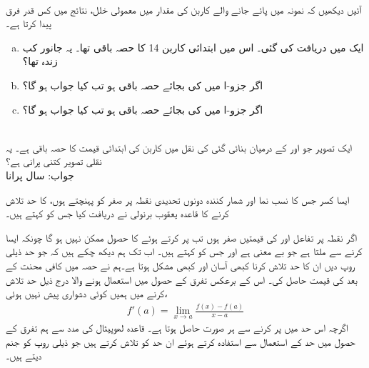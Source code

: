 \\
آئیں دیکھیں کہ نمونہ میں پائے جانے والے کاربن کی مقدار میں معمولی خلل، نتائج میں کس قدر فرق پیدا کرتا ہے۔
\begin{enumerate}[a.]
\item
ایک   میں دریافت کی گئی۔ اس میں ابتدائی کاربن 14 کا  حصہ باقی تھا۔ یہ جانور کب زندہ تھا؟
\item
اگر جزو-ا میں  کی بجائے  حصہ باقی ہو تب کیا جواب ہو گا؟
\item
اگر جزو-ا میں  کی بجائے  حصہ باقی ہو تب کیا جواب ہو گا؟
\end{enumerate}
\\
ایک تصویر جو  اور  کے درمیان بنائی گئی کی نقل میں کاربن  کی ابتدائی قیمت کا  حصہ باقی ہے۔ یہ نقلی تصویر کتنی پرانی ہے؟\\
جواب:\quad
{} سال پرانا

ایسا کسر جس کا نسب نما اور شمار کنندہ دونوں تحدیدی نقطہ پر  صفر کو پہنچتے ہوں، کا حد تلاش کرنے کا قاعدہ یعقوب برنولی نے دریافت کیا جس کو  کہتے ہیں۔

اگر نقطہ  پر تفاعل  اور  کی قیمتیں صفر ہوں تب  پر کرتے ہوئے   کا حصول ممکن نہیں ہو گا چونکہ ایسا کرنے سے  ملتا ہے جو بے معنی ہے اور  جس کو  کہتے ہیں۔ اب تک ہم دیکھ چکے ہیں کہ جو حد ذیلی روپ دیں ان کا حد تلاش کرنا کبھی آسان اور کبھی مشکل ہوتا ہے۔ہم نے حصہ  میں کافی محنت کے بعد  کی قیمت حاصل کی۔ اس کے برعکس تفرق کے حصول میں استعمال ہونے والا درج ذیل حد تلاش کرنے میں ہمیں کوئی دشواری پیش نہیں ہوئی،
\begin{align*}
f'(a)=\lim_{x\to a}\frac{f(x)-f(a)}{x-a}
\end{align*}
اگرچہ اس حد میں  پر کرنے سے ہر صورت  حاصل ہوتا ہے۔ قاعدہ لھوپیٹال  کی مدد سے ہم تفرق کے حصول میں حد کے استعمال سے استفادہ کرتے ہوئے ان حد کو تلاش کرتے ہیں جو ذیلی روپ کو جنم دیتے ہیں۔

